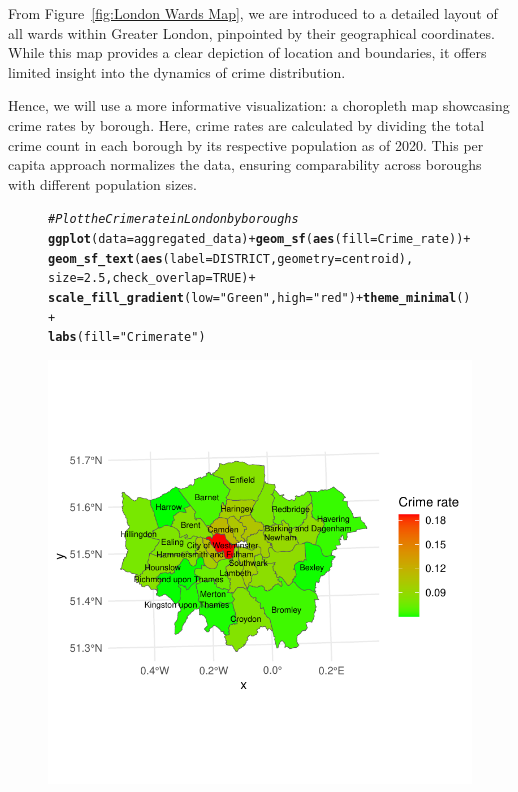 \documentclass{article}\usepackage[]{graphicx}\usepackage[]{xcolor}
\makeatletter
\def\maxwidth{ %
  \ifdim\Gin@nat@width>\linewidth
    \linewidth
  \else
    \Gin@nat@width
  \fi
}
\newcommand{\hlnum}[1]{\textcolor[rgb]{0.686,0.059,0.569}{#1}}%
\newcommand{\hlstr}[1]{\textcolor[rgb]{0.192,0.494,0.8}{#1}}%
\newcommand{\hlcom}[1]{\textcolor[rgb]{0.678,0.584,0.686}{\textit{#1}}}%
\newcommand{\hlopt}[1]{\textcolor[rgb]{0,0,0}{#1}}%
\newcommand{\hlstd}[1]{\textcolor[rgb]{0.345,0.345,0.345}{#1}}%
\newcommand{\hlkwc}[1]{\textcolor[rgb]{0.333,0.667,0.333}{#1}}%
\newcommand{\hlkwd}[1]{\textcolor[rgb]{0.737,0.353,0.396}{\textbf{#1}}}%
\newenvironment{kframe}{%
 \def\at@end@of@kframe{}%
 \ifinner\ifhmode%
  \def\at@end@of@kframe{\end{minipage}}%
  \begin{minipage}{\columnwidth}%
 \fi\fi%
 \def\FrameCommand##1{\hskip\@totalleftmargin \hskip-\fboxsep
 \colorbox{shadecolor}{##1}\hskip-\fboxsep
     \hskip-\linewidth \hskip-\@totalleftmargin \hskip\columnwidth}%
 \MakeFramed {\advance\hsize-\width
   \@totalleftmargin\z@ \linewidth\hsize
   \@setminipage}}%
 {\par\unskip\endMakeFramed%
 \at@end@of@kframe}
\newenvironment{knitrout}{}{} %
\makeatother
\begin{document}
From Figure~\ref{fig:London Wards Map}, we are introduced to a detailed layout of all wards within Greater London, pinpointed by their geographical coordinates. While this map provides a clear depiction of location and boundaries, it offers limited insight into the dynamics of crime distribution.

Hence, we will use a more informative visualization: a choropleth map showcasing crime rates by borough. Here, crime rates are calculated by dividing the total crime count in each borough by its respective population as of 2020. This per capita approach normalizes the data, ensuring comparability across boroughs with different population sizes.

\begin{figure}[H]
\begin{knitrout}\scriptsize
{}\color{fgcolor}\begin{kframe}
\begin{alltt}
\hlcom{# Plot the Crime rate in London by boroughs}
\hlkwd{ggplot}\hlstd{(}\hlkwc{data}\hlstd{=aggregated_data)} \hlopt{+} \hlkwd{geom_sf}\hlstd{(}\hlkwd{aes}\hlstd{(}\hlkwc{fill}\hlstd{=Crime_rate))} \hlopt{+}
  \hlkwd{geom_sf_text}\hlstd{(}\hlkwd{aes}\hlstd{(}\hlkwc{label} \hlstd{= DISTRICT,} \hlkwc{geometry} \hlstd{= centroid),}
               \hlkwc{size} \hlstd{=} \hlnum{2.5}\hlstd{,} \hlkwc{check_overlap} \hlstd{=} \hlnum{TRUE}\hlstd{)} \hlopt{+}
  \hlkwd{scale_fill_gradient}\hlstd{(}\hlkwc{low}\hlstd{=}\hlstr{"Green"}\hlstd{,} \hlkwc{high}\hlstd{=}\hlstr{"red"}\hlstd{)} \hlopt{+} \hlkwd{theme_minimal}\hlstd{()} \hlopt{+}
  \hlkwd{labs}\hlstd{(}\hlkwc{fill}\hlstd{=}\hlstr{"Crime rate"}\hlstd{)}
\end{alltt}
\end{kframe}

{\centering \includegraphics[width=\maxwidth]{figure/beamer-unnamed-chunk-7-1} 

}
\end{knitrout}
\end{figure}
\end{document}
